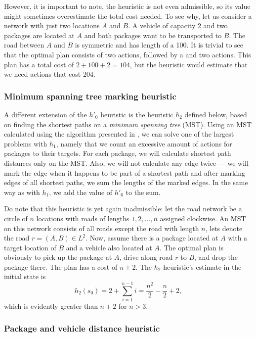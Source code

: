However, it is important to note, the heuristic
is not even admissible, so its value might sometimes overestimate the total cost needed.
To see why, let us consider a network with just two locations $A$ and $B$.
A vehicle of capacity 2 and two packages are located at $A$ and both packages want to be
transported to $B$. The road between $A$ and $B$ is symmetric and has length
of a 100. It is trivial to see that the optimal plan consists of two \pickup{} actions,
followed by a \drive{} and two \drop{} actions. This plan has a total cost of $2+100+2=104$,
but the heuristic would estimate that we need actions
that cost $204$.

\subsubsection{Minimum spanning tree marking heuristic}\label{sfa2}

A different extension of the $h'_0$ heuristic
is the heuristic $h_2$ defined below, based
on finding the shortest paths on a \textit{minimum spanning tree} (MST).
Using an MST calculated using the algorithm presented in \citet{Kruskal1956}, we can solve one of the largest problems with $h_1$,
namely that we count an excessive amount of \drive{} actions
for packages to their targets.
For each package, we will calculate
shortest path distances only on the MST.
Also, we will not calculate any edge twice --- we will mark
the edge when it happens to be part of a shortest path and
after marking edges of all shortest paths,
we sum the lengths of the marked edges.
In the same way as with $h_1$, we add the value of $h'_0$ to
the sum.

Do note that this heuristic is yet again inadmissible:
let the road network be a circle of $n$ locations with
roads of lengths $1, 2, \ldots, n$ assigned clockwise.
An MST on this network consists of all roads except the road
with length $n$, lets denote the road $r = (A, B) \in L^2$.
Now, assume there is a package located at $A$ with a target
location of $B$ and a vehicle also located at $A$.
The optimal plan is obviously to pick up the package at $A$,
drive along road $r$ to $B$, and drop the package there.
The plan has a cost of $n+2$. The $h_2$ heuristic's estimate
in the initial state is $$h_2(s_0) = 2 + \sum_{i=1}^{n-1} i = \frac{n^2}{2} - \frac{n}{2} + 2,$$
which is evidently greater than $n+2$ for $n > 3$.

\subsubsection{Package and vehicle distance heuristic}\label{sfa3}

